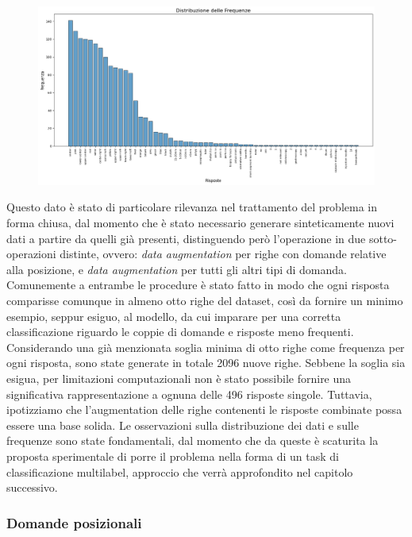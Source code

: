 \documentclass[../main.tex]{subfiles}
\begin{document}
\begin{figure}[H]
    \centering
    \includegraphics[width=1\linewidth]{static/grafico_frequenze.png}
    \label{fig:enter-label}
\end{figure}

Questo dato è stato di particolare rilevanza nel trattamento del problema in forma chiusa, dal momento che è stato necessario generare sinteticamente nuovi dati a partire da quelli già presenti, distinguendo però l'operazione in due sotto-operazioni distinte, ovvero: \textit{data augmentation} per righe con domande relative alla posizione, e \textit{data augmentation} per tutti gli altri tipi di domanda.
Comunemente a entrambe le procedure è stato fatto in modo che ogni risposta comparisse comunque in almeno otto righe del dataset, così da fornire un minimo esempio, seppur esiguo, al modello, da cui imparare per una corretta classificazione riguardo le coppie di domande e risposte meno frequenti.
Considerando una già menzionata soglia minima di otto righe come frequenza per ogni risposta, sono state generate in totale 2096 nuove righe.
Sebbene la soglia sia esigua, per limitazioni computazionali non è stato possibile fornire una significativa rappresentazione a ognuna delle 496 risposte singole. 
Tuttavia, ipotizziamo che l'augmentation delle righe contenenti le risposte combinate possa essere una base solida.
Le osservazioni sulla distribuzione dei dati e sulle frequenze sono state fondamentali, dal momento che da queste è scaturita la proposta sperimentale di porre il problema nella forma di un task di classificazione multilabel, approccio che verrà approfondito nel capitolo successivo.

\subsubsection{Domande posizionali}
\end{document}
